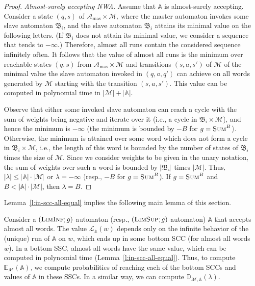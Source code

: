 \documentclass{lmcs}
\newcommand{\proofideas}{\smallskip\noindent{\emph{The key ideas.}}}
\newcommand{\masterA}{\mathcal{A}_{\textrm{mas}}}
\newcommand{\nestedA}{\mathbb{A}}
\newcommand{\slaveA}{{\mathfrak{B}}}
\newcommand{\valueL}[1]{\mathcal{L}_{{#1}}}
\newcommand{\fBsum}[1]{\textsc{Sum}^{#1}}
\newcommand{\fliminf}{\textsc{LimInf}}
\newcommand{\flimsup}{\textsc{LimSup}}
\newcommand{\const}{\lambda}
\newcommand{\expected}{\mathbb{E}}
\newcommand{\distrib}{\mathbb{D}}
\newcommand{\markov}{\mathcal{M}}
\begin{document}
\begin{proof}
\noindent\emph{Almost-surely accepting NWA}.
Assume that $\nestedA$ is almost-surely accepting.
 Consider a state $(q,s)$ of $\masterA \times \markov$, where the master automaton invokes some slave automaton $\slaveA_i$, and the slave automaton $\slaveA_i$ attains its minimal value on the following letters.
(If $\slaveA_i$ does not attain its minimal value, we consider a sequence that tends to $-\infty$.)
Therefore, almost all runs contain the considered sequence infinitely often.
It follows that the value of almost all runs is the minimum over reachable states $(q,s)$ from $\masterA \times \markov$ and transitions $(s,a,s')$ of $\markov$
of the minimal value the slave automaton invoked in $(q,a,q')$ can achieve on all words generated by $\markov$ starting with the transition $(s,a,s')$.
This value can be computed in polynomial time in $|\markov| + |\nestedA|$.

Observe that either some invoked slave automaton can reach a cycle with the sum of weights being negative and iterate over it (i.e., a cycle in $\slaveA_i \times \markov$),
and hence the minimum is $-\infty$ (the minimum is bounded by $-B$ for  $g = \fBsum{B}$).
Otherwise, the minimum is attained over some word which does not form a cycle in $\slaveA_i \times \markov$, i.e., the length of this word is bounded by the number of states of $\slaveA_i$ times the size of $\markov$.
Since we consider weights to be given in the unary notation,
the sum of weights over such a word is bounded by $|\slaveA_i|$ times $|\markov|$.
Thus, $|\lambda| \leq |\nestedA| \cdot |\markov|$ or $\lambda = -\infty$ (resp., $-B$ for  $g = \fBsum{B}$).
If  $g = \fBsum{B}$ and $B < |\nestedA| \cdot |\markov|$, then $\lambda = B$.
\end{proof}


Lemma~\ref{l:in-scc-all-equal} implies the following main lemma of this section.

\proofideas{}
Consider a $(\fliminf; g)$-automaton (resp., $(\flimsup; g)$-automaton)
$\nestedA$ that accepts almost all words.
The value $\valueL{\nestedA}(w)$ depends only on the infinite behavior of the (unique) run of $\nestedA$ on $w$, which ends up in some bottom SCC (for almost all words $w$).
In a bottom SSC, almost all words have the same value, which can be computed in polynomial time (Lemma~\ref{l:in-scc-all-equal}).
Thus, to compute $\expected_{\markov}(\nestedA)$, we compute probabilities of reaching each of the
bottom SCCs and values of $\nestedA$ in these SSCs.
In a similar way, we can compute $\distrib_{\markov,\nestedA}(\const)$.
\end{document}

